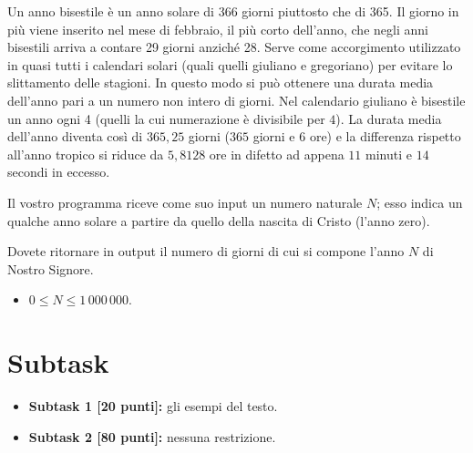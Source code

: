 \renewcommand{\nomebreve}{bisestile\_giuliano}
\renewcommand{\titolo}{Esercizio uso if: Riconscimento di anni bisestili}

\introduzione{}

Un anno bisestile è un anno solare di 366 giorni piuttosto che di 365.
Il giorno in più viene inserito nel mese di febbraio, il più corto dell'anno, che negli anni bisestili arriva a contare 29 giorni anziché 28.
Serve come accorgimento utilizzato in quasi tutti i calendari solari (quali quelli giuliano e gregoriano) per evitare lo slittamento delle stagioni.
In questo modo si può ottenere una durata media dell'anno pari a un numero non intero di giorni. 
Nel calendario giuliano è bisestile un anno ogni 4 (quelli la cui numerazione è divisibile per $4$). La durata media dell'anno diventa così di $365,25$ giorni ($365$ giorni e $6$ ore) e la differenza rispetto all'anno tropico si riduce da $5,8128$ ore in difetto ad appena $11$ minuti e $14$ secondi in eccesso.

Il vostro programma riceve come suo input un numero naturale $N$; esso indica un qualche anno solare a partire da quello della nascita di Cristo (l'anno zero).


Dovete ritornare in output il numero di giorni di cui si compone l'anno $N$ di Nostro Signore.






\begin{itemize}[nolistsep, noitemsep]
  \item $0 \le N \le 1\,000\,000$.
\end{itemize}
  
  \section*{Subtask}
  \begin{itemize}
    \item \textbf{Subtask 1 [20 punti]:} gli esempi del testo.
    \item \textbf{Subtask 2 [80 punti]:} nessuna restrizione.
  \end{itemize}
  
